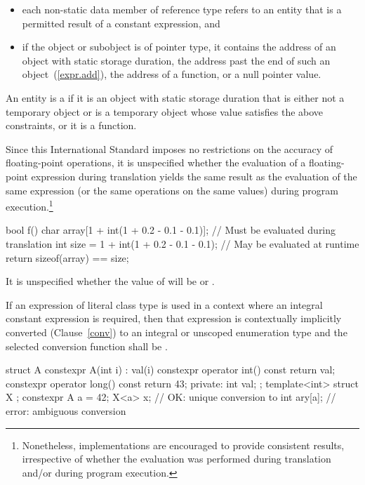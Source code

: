 \begin{itemize}
  \item
  each non-static data member of reference type refers to
  an entity that is a permitted result of a constant expression, and

  \item
  if the object or subobject is of pointer type, it contains
  the address of an object with static storage duration,
  the address past the end of such an object~(\ref{expr.add}),
  the address of a function,
  or a null pointer value.
\end{itemize}
%
An entity is a  if it is an
object with static storage duration that is either not a temporary object or is
a temporary object whose value satisfies the above constraints, or it is a
function.

\pnum
\enternote Since this International Standard
imposes no restrictions on the accuracy of floating-point operations, it is unspecified whether the
evaluation of a floating-point expression during translation yields the same result as the
evaluation of the same expression (or the same operations on the same values) during program
execution.\footnote{Nonetheless, implementations are encouraged to provide consistent results,
irrespective of whether the evaluation was performed during translation and/or during program
execution.} \enterexample

\begin{codeblock}
bool f() {
    char array[1 + int(1 + 0.2 - 0.1 - 0.1)];  // Must be evaluated during translation
    int size = 1 + int(1 + 0.2 - 0.1 - 0.1);   // May be evaluated at runtime
    return sizeof(array) == size;
}
\end{codeblock}
It is unspecified whether the value of  will be  or .
\exitexample \exitnote

\pnum
If an expression of literal class type is used in a context where an 
integral constant expression is required, then that expression is
contextually implicitly converted (Clause~\ref{conv}) to an integral or unscoped
enumeration type 
and the selected conversion function shall be . \enterexample
\begin{codeblock}
struct A { 
  constexpr A(int i) : val(i) { } 
  constexpr operator int() const { return val; }
  constexpr operator long() const { return 43; }
private: 
  int val; 
}; 
template<int> struct X { }; 
constexpr A a = 42; 
X<a> x;             // OK: unique conversion to 
int ary[a];         // error: ambiguous conversion 
\end{codeblock}
\exitexample%
